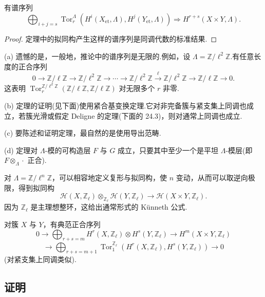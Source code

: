 \begin{corollary}\label{cor:22.2}
有谱序列
\[
\bigoplus_{i+j=s} \operatorname{Tor}^{\Lambda}_{r}(H^{i}(X_{\mathrm{et}}, \Lambda), H^{j}(Y_{\mathrm{et}}, \Lambda)) \Rightarrow H^{r+s}(X \times Y, \Lambda).
\]
\end{corollary}

\begin{proof}
定理中的拟同构产生这样的谱序列是同调代数的标准结果.
\end{proof}

\begin{remark}\label{rem:22.3}
(a) 遗憾的是，一般地，推论中的谱序列是无限的.例如，设 $\Lambda = \mathbb{Z}/\ell^{2}\mathbb{Z}$.有任意长度的正合序列
\[
0 \to \mathbb{Z}/\ell\mathbb{Z} \to \mathbb{Z}/\ell^{2}\mathbb{Z} \to \cdots \to \mathbb{Z}/\ell^{2}\mathbb{Z} \xrightarrow{\ell} \mathbb{Z}/\ell^{2}\mathbb{Z} \to \mathbb{Z}/\ell\mathbb{Z} \to 0.
\]
这表明 $\operatorname{Tor}^{\mathbb{Z}/\ell^{2}\mathbb{Z}}_{r}(\mathbb{Z}/\ell\mathbb{Z}, \mathbb{Z}/\ell\mathbb{Z})$ 对无限多个 $r$ 非零.

(b) 定理的证明(见下面)使用紧合基变换定理.它对非完备簇与紧支集上同调也成立，若簇光滑或假定 Deligne 的定理(下面的 24.3)，则对通常上同调也成立.

(c) 要陈述和证明定理，最自然的是使用导出范畴.

(d) 定理对 $\Lambda$-模的可构造层 $F$ 与 $G$ 成立，只要其中至少一个是平坦 $\Lambda$-模层(即 $F \otimes_{\Lambda} \cdot$ 正合).

对 $\Lambda = \mathbb{Z}/\ell^{n}\mathbb{Z}$，可以相容地定义复形与拟同构，使 $n$ 变动，从而可以取逆向极限，得到拟同构
\[
\mathcal{H}(X, \mathbb{Z}_{\ell}) \otimes_{\mathbb{Z}_{\ell}} \mathcal{H}(Y, \mathbb{Z}_{\ell}) \to \mathcal{H}(X \times Y, \mathbb{Z}_{\ell}).
\]
因为 $\mathbb{Z}_{\ell}$ 是主理想整环，这给出通常形式的 K\"unneth 公式.
\end{remark}

\begin{theorem}\label{thm:22.4}
对簇 $X$ 与 $Y$，有典范正合序列
\[
0 \to \bigoplus_{r+s=m} H^{r}(X, \mathbb{Z}_{\ell}) \otimes H^{s}(Y, \mathbb{Z}_{\ell}) \to H^{m}(X \times Y, \mathbb{Z}_{\ell})
\]
\[
\to \bigoplus_{r+s=m+1} \operatorname{Tor}^{\mathbb{Z}_{\ell}}_1(H^{r}(X, \mathbb{Z}_{\ell}), H^{s}(Y, \mathbb{Z}_{\ell})) \to 0
\]
(对紧支集上同调类似).
\end{theorem}

\subsection*{证明}

